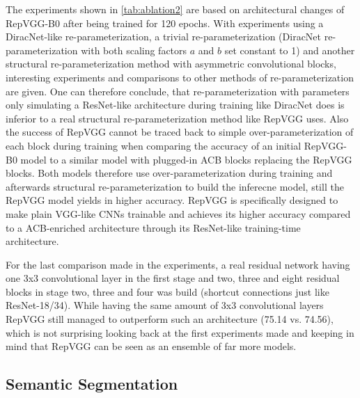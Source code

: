 The experiments shown in \autoref{tab:ablation2} are based on architectural changes of RepVGG-B0 after being trained for 120 epochs. With experiments using a DiracNet-like re-parameterization, a trivial re-parameterization (DiracNet re-parameterization with both scaling factors $a$ and $b$ set constant to 1) and another structural re-parameterization method with asymmetric convolutional blocks, interesting experiments and comparisons to other methods of re-parameterization are given. One can therefore conclude, that re-parameterization with parameters only simulating a ResNet-like architecture during training like DiracNet does is inferior to a real structural re-parameterization method like RepVGG uses. Also the success of RepVGG cannot be traced back to simple over-parameterization of each block during training when comparing the accuracy of an initial RepVGG-B0 model to a similar model with plugged-in ACB blocks replacing the RepVGG blocks. Both models therefore use over-parameterization during training and afterwards structural re-parameterization to build the inferecne model, still the RepVGG model yields in higher accuracy. RepVGG is specifically designed to make plain VGG-like CNNs trainable and achieves its higher accuracy compared to a ACB-enriched architecture through its ResNet-like training-time architecture. 

For the last comparison made in the experiments, a real residual network having one 3x3 convolutional layer in the first stage and two, three and eight residual blocks in stage two, three and four was build (shortcut connections just like ResNet-18/34). While having the same amount of 3x3 convolutional layers RepVGG still managed to outperform such an architecture (75.14 vs. 74.56), which is not surprising looking back at the first experiments made and keeping in mind that RepVGG can be seen as an ensemble of far more models. 

\subsection{Semantic Segmentation}
